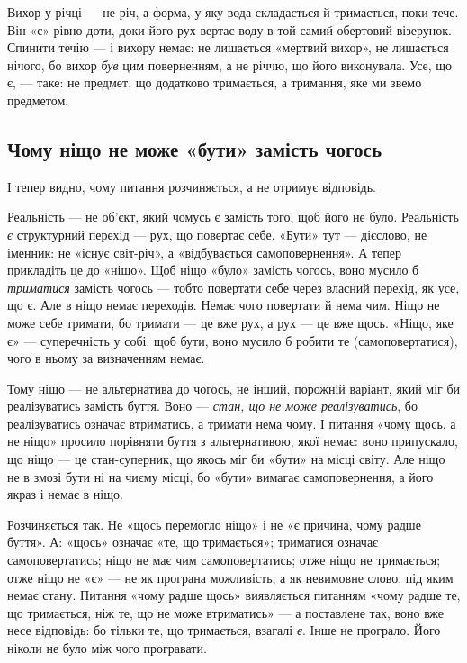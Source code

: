 \documentclass[12pt, a4paper, openany]{book}
\begin{document}
\begin{analogybox}
Вихор у річці --- не річ, а форма, у яку вода складається й тримається, поки тече. Він «є» рівно доти, доки його рух вертає воду в той самий обертовий візерунок. Спинити течію --- і вихору немає: не лишається «мертвий вихор», не лишається нічого, бо вихор \emph{був} цим поверненням, а не річчю, що його виконувала. Усе, що є, --- таке: не предмет, що додатково тримається, а тримання, яке ми звемо предметом.
\end{analogybox}

\subsection{Чому ніщо не може «бути» замість чогось}

І тепер видно, чому питання розчиняється, а не отримує відповідь.

Реальність --- не об'єкт, який чомусь є замість того, щоб його не було. Реальність \emph{є} структурний перехід --- рух, що повертає себе. «Бути» тут --- дієслово, не іменник: не «існує світ-річ», а «відбувається самоповернення». А тепер прикладіть це до «ніщо». Щоб ніщо «було» замість чогось, воно мусило б \emph{триматися} замість чогось --- тобто повертати себе через власний перехід, як усе, що є. Але в ніщо немає переходів. Немає чого повертати й нема чим. Ніщо не може себе тримати, бо тримати --- це вже рух, а рух --- це вже щось. «Ніщо, яке є» --- суперечність у собі: щоб бути, воно мусило б робити те (самоповертатися), чого в ньому за визначенням немає.

Тому ніщо --- не альтернатива до чогось, не інший, порожній варіант, який міг би реалізуватись замість буття. Воно --- \emph{стан, що не може реалізуватись}, бо реалізуватись означає втриматись, а тримати нема чому. І питання «чому щось, а не ніщо» просило порівняти буття з альтернативою, якої немає: воно припускало, що ніщо --- це стан-суперник, що якось міг би «бути» на місці світу. Але ніщо не в змозі бути ні на чиєму місці, бо «бути» вимагає самоповернення, а його якраз і немає в ніщо.

Розчиняється так. Не «щось перемогло ніщо» і не «є причина, чому радше буття». А: «щось» означає «те, що тримається»; триматися означає самоповертатись; ніщо не має чим самоповертатись; отже ніщо не тримається; отже ніщо не «є» --- не як програна можливість, а як невимовне слово, під яким немає стану. Питання «чому радше щось» виявляється питанням «чому радше те, що тримається, ніж те, що не може втриматись» --- а поставлене так, воно вже несе відповідь: бо тільки те, що тримається, взагалі \emph{є}. Інше не програло. Його ніколи не було між чого програвати.
\end{document}
